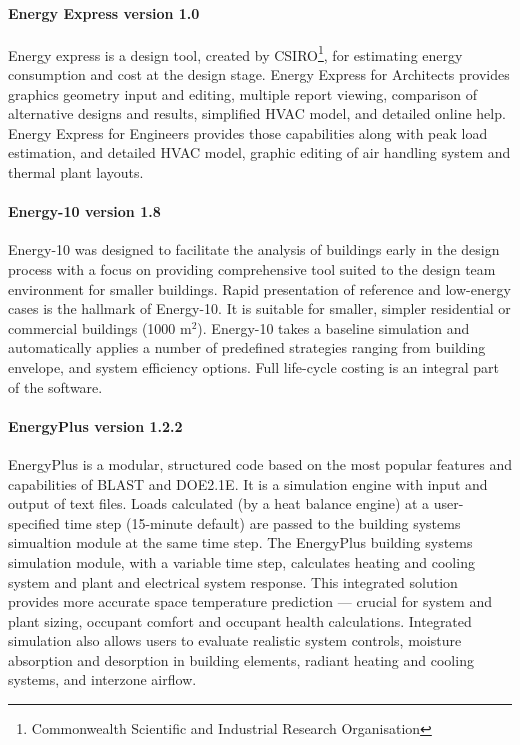 \paragraph{Energy Express version 1.0} Energy express is a design tool, created by CSIRO\footnote{Commonwealth Scientific and Industrial Research Organisation}, for estimating energy consumption and cost at the design stage. Energy Express for Architects provides graphics geometry input and editing, multiple report viewing, comparison of alternative designs and results, simplified HVAC model, and detailed online help. Energy Express for Engineers provides those capabilities along with peak load estimation, and detailed HVAC model, graphic editing of air handling system and thermal plant layouts.

\paragraph{Energy-10 version 1.8} Energy-10 was designed to facilitate the analysis of buildings early in the design process with a focus on providing comprehensive tool suited to the design team environment for smaller buildings. Rapid presentation of reference and low-energy cases is the hallmark of Energy-10. It is suitable for smaller, simpler residential or commercial buildings (1000 m$^2$). Energy-10 takes a baseline simulation and automatically applies a number of predefined strategies ranging from building envelope, and system efficiency options. Full life-cycle costing is an integral part of the software.

\paragraph{EnergyPlus version 1.2.2} EnergyPlus is a modular, structured code based on the most popular features and capabilities of BLAST and DOE2.1E. It is a simulation engine with input and output of text files. Loads calculated (by a heat balance engine) at a user-specified time step (15-minute default) are passed to the building systems simualtion module at the same time step. The EnergyPlus building systems simulation module, with a variable time step, calculates heating and cooling system and plant and electrical system response. This integrated solution provides more accurate space temperature prediction --- crucial for system and plant sizing, occupant comfort and occupant health calculations. Integrated simulation also allows users to evaluate realistic system controls, moisture absorption and desorption in building elements, radiant heating and cooling systems, and interzone airflow. \label{par:EnergyPlus}

